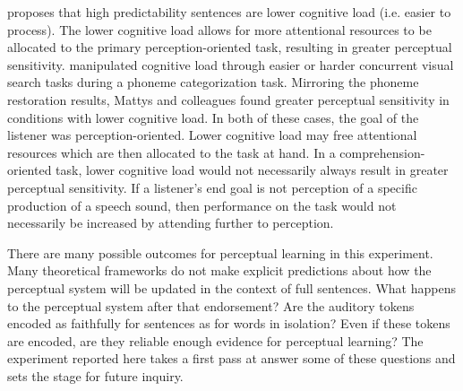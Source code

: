 \citet{Samuel1981} proposes that high predictability sentences are lower cognitive load (i.e. easier to process).  
The lower cognitive load allows for more attentional resources to be allocated to the primary perception-oriented task, resulting in greater perceptual sensitivity.
\citet{Mattys2011} manipulated cognitive load through easier or harder concurrent visual search tasks during a phoneme categorization task.
Mirroring the phoneme restoration results, Mattys and colleagues found greater perceptual sensitivity in conditions with lower cognitive load.
In both of these cases, the goal of the listener was perception-oriented.
Lower cognitive load may free attentional resources which are then allocated to the task at hand.
In a comprehension-oriented task, lower cognitive load would not necessarily always result in greater perceptual sensitivity. 
If a listener's end goal is not perception of a specific production of a speech sound, then performance on the task would not necessarily be increased by attending further to perception.

There are many possible outcomes for perceptual learning in this experiment.
Many theoretical frameworks do not make explicit predictions about how the perceptual system will be updated in the context of full sentences.
What happens to the perceptual system after that endorsement?
Are the auditory tokens encoded as faithfully for sentences as for words in isolation?
Even if these tokens are encoded, are they reliable enough evidence for perceptual learning?
The experiment reported here takes a first pass at answer some of these questions and sets the stage for future inquiry. 

